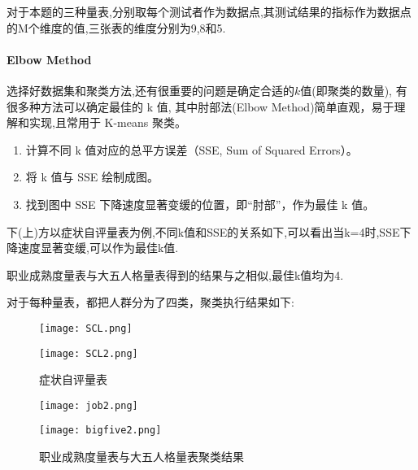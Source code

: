 \documentclass[withoutpreface,bwprint]{cumcmthesis} %
\begin{document}
对于本题的三种量表,分别取每个测试者作为数据点,其测试结果的指标作为数据点的M个维度的值,三张表的维度分别为9,8和5.


\paragraph*{Elbow Method}选择好数据集和聚类方法,还有很重要的问题是确定合适的$k$值(即聚类的数量),
有很多种方法可以确定最佳的 k 值, 其中肘部法(Elbow Method)简单直观，易于理解和实现,且常用于 K-means 聚类。
\begin{enumerate}
    \item 计算不同 k 值对应的总平方误差（SSE, Sum of Squared Errors）。
    
    \item 将 k 值与 SSE 绘制成图。

    \item 找到图中 SSE 下降速度显著变缓的位置，即“肘部”，作为最佳 k 值。

\end{enumerate}
下(上)方以症状自评量表为例,不同k值和SSE的关系如下,可以看出当k=4时,SSE下降速度显著变缓,可以作为最佳k值.

职业成熟度量表与大五人格量表得到的结果与之相似,最佳k值均为4.

对于每种量表，都把人群分为了四类，聚类执行结果如下:



\begin{figure}
    \centering
    \begin{minipage}[c]{0.48\textwidth}
        \centering
        \texttt{[image: SCL.png]}
    \end{minipage}
    \begin{minipage}[c]{0.48\textwidth}
        \centering
        \texttt{[image: SCL2.png]}
    \end{minipage}
    \caption{症状自评量表}
\end{figure}


\begin{figure}
    \centering
    \begin{minipage}[c]{0.48\textwidth}
        \centering
        \texttt{[image: job2.png]}
    \end{minipage}
    \begin{minipage}[c]{0.48\textwidth}
        \centering
        \texttt{[image: bigfive2.png]}
    \end{minipage}
    \caption{职业成熟度量表与大五人格量表聚类结果}
\end{figure}
\end{document}
